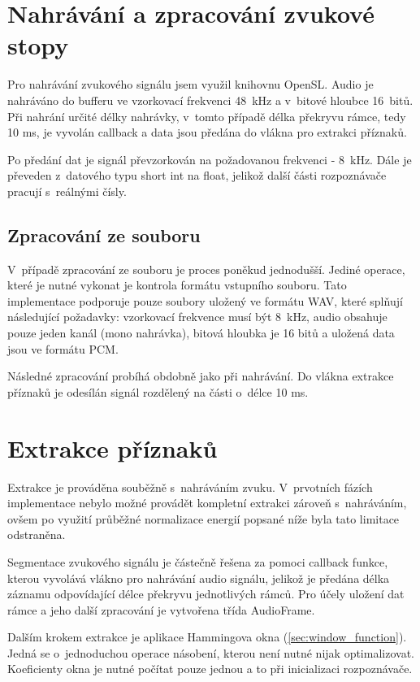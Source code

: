\section{Nahrávání a zpracování zvukové stopy}
Pro nahrávání zvukového signálu jsem využil knihovnu OpenSL. Audio je nahráváno do bufferu ve vzorkovací frekvenci 48~kHz a v~bitové hloubce 16~bitů. Při nahrání určité délky nahrávky, v~tomto případě délka překryvu rámce, tedy 10 ms, je vyvolán callback a data jsou předána do vlákna pro extrakci příznaků.

Po předání dat je signál převzorkován na požadovanou frekvenci - 8~kHz. Dále je převeden z~datového typu short int na float, jelikož další části rozpoznávače pracují s~reálnými čísly. 

\subsection{Zpracování ze souboru}
V~případě zpracování ze souboru je proces poněkud jednodušší. Jediné operace, které je nutné vykonat je kontrola formátu vstupního souboru. Tato implementace podporuje pouze soubory uložený ve formátu WAV, které splňují následující požadavky: vzorkovací frekvence musí být 8~kHz, audio obsahuje pouze jeden kanál (mono nahrávka), bitová hloubka je 16 bitů a uložená data jsou ve formátu PCM.

Následné zpracování probíhá obdobně jako při nahrávání. Do vlákna extrakce příznaků je odesílán signál rozdělený na části o~délce 10 ms.
\section{Extrakce příznaků}\label{sec:impl_fe}
Extrakce je prováděna souběžně s~nahráváním zvuku. V~prvotních fázích implementace nebylo možné provádět kompletní extrakci zároveň s~nahráváním, ovšem po využití průběžné normalizace energií popsané níže byla tato limitace odstraněna.

Segmentace zvukového signálu je částečně řešena za pomoci callback funkce, kterou vyvolává vlákno pro nahrávání audio signálu, jelikož je předána délka záznamu odpovídající délce překryvu jednotlivých rámců. Pro účely uložení dat rámce a jeho další zpracování je vytvořena třída AudioFrame.

Dalším krokem extrakce je aplikace Hammingova okna (\ref{sec:window_function}). Jedná se o~jednoduchou operace násobení, kterou není nutné nijak optimalizovat. Koeficienty okna je nutné počítat pouze jednou a to při inicializaci rozpoznávače.

